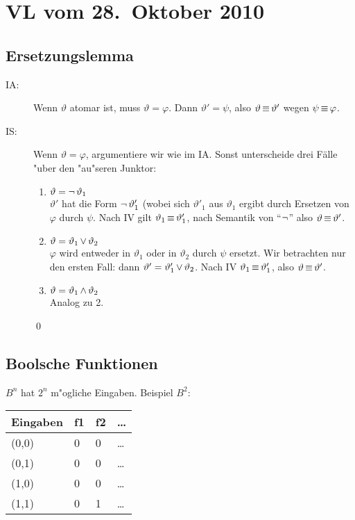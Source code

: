 \section{VL vom 28.~Oktober 2010}

\subsection{Ersetzungslemma}

\begin{description}
  \item[IA:]
  Wenn $\vartheta$ atomar ist, muss $\vartheta = \varphi$. Dann $\vartheta'=\psi$,
  also $\vartheta\operatorname{\equiv}\vartheta'$ wegen $\psi\operatorname{\equiv}\varphi$.

  \item[IS:]
  Wenn $\vartheta=\varphi$, argumentiere wir wie im IA. Sonst unterscheide drei Fälle "uber den "au"seren Junktor:

  \begin{enumerate}
    \item $\vartheta = \operatorname{\neg} \vartheta_1$\\
    $\vartheta'$ hat die Form $\operatorname{\neg}\vartheta'_1$ (wobei sich $\vartheta'_1$ aus
    $\vartheta_1$ ergibt durch Ersetzen von $\varphi$ durch $\psi$. Nach IV gilt
    $\vartheta_1\operatorname{\equiv}\vartheta'_1$, nach Semantik von \enquote{$\operatorname{\neg}$} also
    $\vartheta\operatorname{\equiv}\vartheta'$.
    
    \item $\vartheta = \vartheta_1\operatorname{\vee}\vartheta_2$\\
    $\varphi$ wird entweder in $\vartheta_1$ oder in $\vartheta_2$ durch $\psi$
    ersetzt. Wir betrachten nur den ersten Fall: dann
    $\vartheta'=\vartheta'_1\operatorname{\vee}\vartheta_2$. Nach IV $\vartheta_1\operatorname{\equiv}\vartheta'_1$, also $\vartheta\operatorname{\equiv}\vartheta'$.
    
    \item $\vartheta = \vartheta_1\operatorname{\wedge}\vartheta_2$\\
    Analog zu 2.
  \end{enumerate}
  \qed
\end{description}


\subsection{Boolsche Funktionen}
$B^n$ hat $2^n$ m"ogliche Eingaben. Beispiel $B^2$:
\begin{tabular}{l|l|l|l}
Eingaben    & f1  & f2  & \dots \\
\hline
(0,0)       & 0   & 0   & \dots \\
(0,1)       & 0   & 0   & \dots \\
(1,0)       & 0   & 0   & \dots \\
(1,1)       & 0   & 1   & \dots
\end{tabular}

